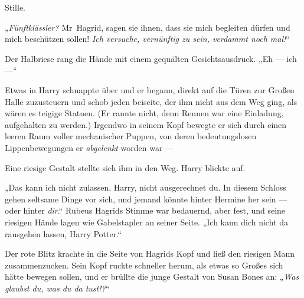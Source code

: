 Stille.

„\emph{Fünftklässler?} Mr~Hagrid, sagen sie ihnen, dass sie mich begleiten dürfen und mich beschützen sollen! \emph{Ich versuche, vernünftig zu sein, verdammt noch mal!}“

Der Halbriese rang die Hände mit einem gequälten Gesichtsausdruck.
„Eh — ich —“

Etwas in Harry schnappte über und er begann, direkt auf die Türen zur Großen Halle zuzusteuern und schob jeden beiseite, der ihm nicht aus dem Weg ging, als wären es teigige Statuen. (Er rannte nicht, denn Rennen war eine Einladung, aufgehalten zu werden.) Irgendwo in seinem Kopf bewegte er sich durch einen leeren Raum voller mechanischer Puppen, von deren bedeutungslosen Lippenbewegungen er \emph{abgelenkt} worden war —

Eine riesige Gestalt stellte sich ihm in den Weg.
Harry blickte auf.

„Das kann ich nicht zulassen, Harry, nicht ausgerechnet du. In diesem Schloss gehen seltsame Dinge vor sich, und jemand könnte hinter Hermine her sein — oder hinter \emph{dir}.“
Rubeus Hagrids Stimme war bedauernd, aber fest, und seine riesigen Hände lagen wie Gabelstapler an seiner Seite.
„Ich kann dich nicht da rausgehen lassen, Harry Potter.“


Der rote Blitz krachte in die Seite von Hagrids Kopf und ließ den riesigen Mann zusammenzucken. Sein Kopf ruckte schneller herum, als etwas so Großes sich hätte bewegen sollen, und er brüllte die junge Gestalt von Susan Bones an:
„\emph{Was glaubst du, was du da tust!?}“

